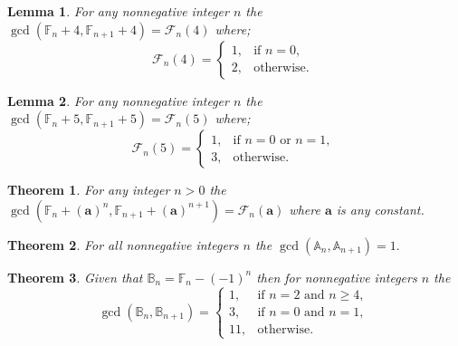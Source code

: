 \documentclass[pdflatex,sn-mathphys-num]{sn-jnl}%
\newtheorem{theorem}{Theorem}
\newtheorem{lemma}{Lemma}
\theoremstyle{thmstyleone}%
\theoremstyle{thmstyletwo}%
\theoremstyle{thmstylethree}%
\begin{document}
\begin{lemma}
    For any nonnegative integer $n$ the $\gcd(\mathbb{F}_n +4,  \mathbb{F}_{n+1}+4)=\mathcal{F}_n(4)$ where;
\begin{equation*}\mathcal{F}_n(4)=
\begin{cases}
	\text{$1$},    & \text{if $n=0$, }\\
	\text{$2$},  & \text{otherwise. }
\end{cases}
 \end{equation*}
\end{lemma}


\begin{lemma}
    For any nonnegative integer $n$ the $\gcd(\mathbb{F}_n +5,  \mathbb{F}_{n+1}+5)=\mathcal{F}_n(5)$ where;
\begin{equation*}\mathcal{F}_n(5)=
\begin{cases}
	\text{$1$},    & \text{if $n=0$ or $n=1$, }\\
	\text{$3$},  & \text{otherwise. }
\end{cases}
 \end{equation*}
    
\end{lemma}




\begin{theorem}
    For any integer $n>0$ the $\gcd(\mathbb{F}_n +(\mathbf{a})^n,  \mathbb{F}_{n+1}+(\mathbf{a})^{n+1})=\mathcal{F}_n(\mathbf{a})$ where $\mathbf{a}$ is any constant.
\end{theorem}

\begin{theorem}
    For all nonnegative integers $n$ the $\gcd(\mathbb{A}_n,  \mathbb{A}_{n+1})=1. $
\end{theorem}

\begin{theorem}
    Given that $\mathbb{B}_n=\mathbb{F}_{n}-(-1)^n $ then for nonnegative integers $n$ the
\begin{equation*}\gcd(\mathbb{B}_n,  \mathbb{B}_{n+1})=
\begin{cases}
	\text{$1$},    & \text{if $n=2$ and $n\geq4$, }\\
	\text{$3$},  & \text{if $n=0$ and $n=1$, }\\
    \text{$11$},  & \text{otherwise. }
\end{cases}
 \end{equation*}

    
\end{theorem}
\end{document}
